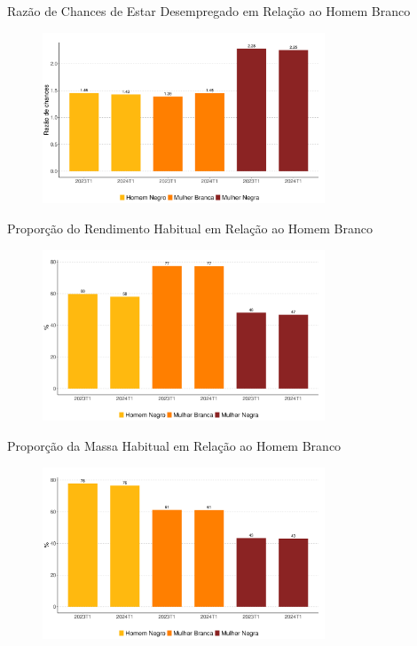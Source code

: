 \documentclass[10pt, xcolor=x11names,compress]{beamer}
\begin{document}
	\begin{frame}{Razão de Chances de Estar Desempregado em Relação ao Homem Branco}
		\begin{figure}
			\centering
			\includegraphics[width = 0.75\textwidth]{../figures_output/frac_unemp.pdf}
		\end{figure}
	\end{frame}
	
	\begin{frame}{Proporção do Rendimento Habitual em Relação ao Homem Branco}
		\begin{figure}
			\centering
			\includegraphics[width = 0.75\textwidth]{../figures_output/frac_rendimento_habitual.pdf}
		\end{figure}
	\end{frame}

	\begin{frame}{Proporção da Massa Habitual em Relação ao Homem Branco}
		\begin{figure}
			\centering
			\includegraphics[width = 0.75\textwidth]{../figures_output/frac_massa_habitual.pdf}
		\end{figure}
	\end{frame}
	
\end{document}
